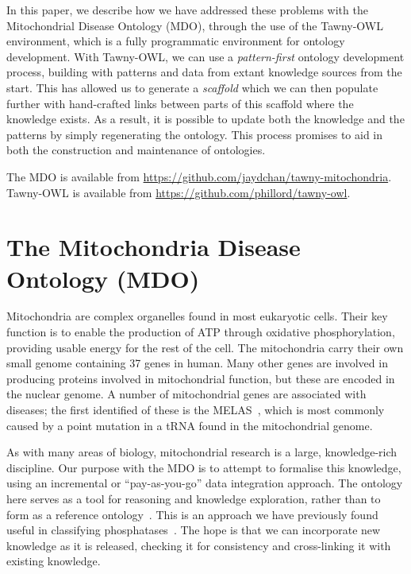 \documentclass{icbo}
\newcommand{\tawny}{Tawny-OWL\xspace}
\begin{document}
In this paper, we describe how we have addressed these problems with the
Mitochondrial Disease Ontology (MDO), through the use of the \tawny
environment, which is a fully programmatic environment for ontology
development. With \tawny, we can use a \textit{pattern-first} ontology
development process, building with patterns and data from extant knowledge
sources from the start. This has allowed us to generate a
  \textit{scaffold} which we can then populate further with hand-crafted links
  between parts of this scaffold where the knowledge exists. As a result, it is
possible to update both the knowledge and the patterns by simply regenerating
the ontology. This process promises to aid in both the construction and
maintenance of ontologies.

\begin{sloppypar}
The MDO is available from
\url{https://github.com/jaydchan/tawny-mitochondria}. \tawny is
available from \url{https://github.com/phillord/tawny-owl}.
\end{sloppypar}

\section{The Mitochondria Disease Ontology (MDO)}
\label{sec:mitoch-dise-ontol}

Mitochondria are complex organelles found in most eukaryotic
cells. Their key function is to enable the production of ATP through
oxidative phosphorylation, providing usable energy for the rest of the
cell. The mitochondria carry their own small genome containing 37
genes in human. Many other genes are involved in producing proteins
involved in mitochondrial function, but these are encoded in the
nuclear genome. A number of mitochondrial genes are associated with
diseases; the first identified of these is the MELAS~\citep{melas},
which is most commonly caused by a point mutation in a tRNA found in
the mitochondrial genome.

As with many areas of biology, mitochondrial research is a large,
knowledge-rich discipline. Our purpose with the MDO is to attempt to
formalise this knowledge, using an incremental or ``pay-as-you-go''
data integration approach. The ontology here serves as a tool for
reasoning and knowledge exploration, rather than to form as a
reference ontology~\citep{handbook2}.  This is an approach we have
previously found useful in classifying
phosphatases~\citep{wolstencroftetal2006}. The hope is that we can
incorporate new knowledge as it is released, checking it for
consistency and cross-linking it with existing knowledge.
\end{document}
